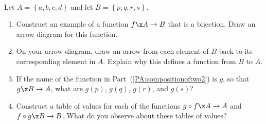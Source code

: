 \begin{previewactivity} \label{PA:compositionoftwo} \hfill \\
Let  $A = \left\{ {a, b, c, d} \right\}$ and  let  $B = \left\{ {p, q, r, s} \right\}$.

\begin{enumerate}
\item Construct an example of a function  $f\x A \to B$  that is a bijection.  Draw an arrow diagram for this function.

\item On your arrow diagram, draw an arrow from each element of  $B$  back to its corresponding element in  $A$.  Explain why this defines a function  from  $B$  to  $A$.  \label{PA:compositionoftwo2}

\item If the name of the function in Part~(\ref{PA:compositionoftwo2}) is  $g$, so that  
$g\x B \to A$, what are  
$g( p )$, $g( q )$, $g( r )$, and $g( s )$?

\item Construct a table of values for each of the functions $g \circ f\x A \to A$  and  
$f \circ g\x B \to B$. What do you observe about these tables of values?
\label{PA:compositionoftwo4}


\end{enumerate}
\end{previewactivity}
\hbreak

\endinput
